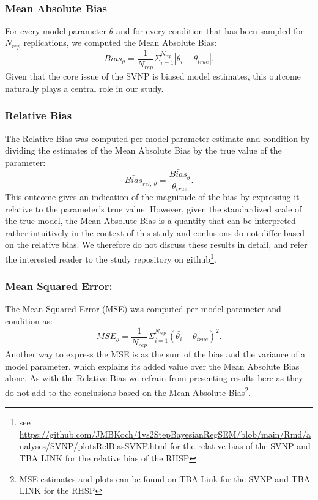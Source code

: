 \documentclass[
  man, donotrepeattitle,floatsintext]{apa6}
\begin{document}
~

\hypertarget{mean-absolute-bias}{%
\subsubsection{Mean Absolute Bias}\label{mean-absolute-bias}}

For every model parameter \(\theta\) and for every condition that has been sampled for \(N_{rep}\) replications, we computed the Mean Absolute Bias:
\[\bar{Bias}_{\bar{\theta}} = \frac{1}{N_{rep}} \Sigma_{i = 1}^{N_{rep}} |\bar{\theta_i} - \theta_{true}|.\]
Given that the core issue of the SVNP is biased model estimates, this outcome naturally plays a central role in our study.

\hypertarget{relative-bias}{%
\subsubsection{Relative Bias}\label{relative-bias}}

The Relative Bias was computed per model parameter estimate and condition by dividing the estimates of the Mean Absolute Bias by the true value of the parameter:
\[\bar{Bias}_{rel, \ \bar{\theta} } = \frac{\bar{Bias}_{\bar{\theta}}}{\theta_{true} }.\]
This outcome gives an indication of the magnitude of the bias by expressing it relative to the parameter's true value. However, given the standardized scale of the true model, the Mean Absolute Bias is a quantity that can be interpreted rather intuitively in the context of this study and conlusions do not differ based on the relative bias. We therefore do not discuss these results in detail, and refer the interested reader to the study repository on github\footnote{see \url{https://github.com/JMBKoch/1vs2StepBayesianRegSEM/blob/main/Rmd/analyses/SVNP/plotsRelBiasSVNP.html} for the relative bias of the SVNP and TBA LINK for the relative bias of the RHSP}.

\hypertarget{mean-squared-error}{%
\subsubsection{Mean Squared Error:}\label{mean-squared-error}}

The Mean Squared Error (MSE) was computed per model parameter and condition as:
\[MSE_{\bar{\theta}} = \frac{1}{N_{rep}} \Sigma_{i = 1}^{N_{rep}} (\bar{\theta_i} - \theta_{true})^2.\]
Another way to express the MSE is as the sum of the bias and the variance of a model parameter, which explains its added value over the Mean Absolute Bias alone. As with the Relative Bias we refrain from presenting results here as they do not add to the conclusions based on the Mean Absolute Bias\footnote{MSE estimates and plots can be found on TBA Link for the SVNP and TBA LINK for the RHSP}.
\end{document}
